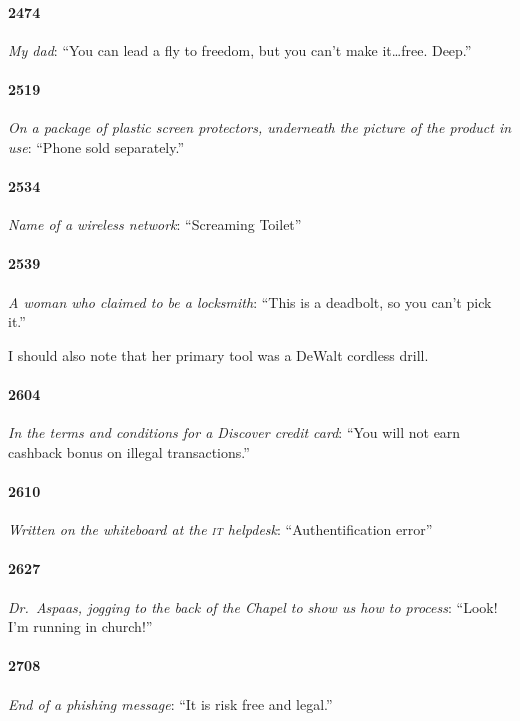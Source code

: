 \documentclass[10pt]{memoir}
\newcommand{\intro}[1]{\emph{#1}}
\begin{document}
\paragraph{2474} \intro{My dad}: ``You can lead a fly to freedom, but you can't make it\ldots free. Deep.''

\paragraph{2519} \intro{On a package of plastic screen protectors, underneath the picture of the product in use}: ``Phone sold separately.''

\paragraph{2534} \intro{Name of a wireless network}: ``Screaming Toilet''

\paragraph{2539} \intro{A woman who claimed to be a locksmith}: ``This is a deadbolt, so you can't pick it.''

I should also note that her primary tool was a DeWalt cordless drill.

\paragraph{2604} \intro{In the terms and conditions for a Discover credit card}: ``You will not earn cashback bonus on illegal transactions.''

\paragraph{2610} \intro{Written on the whiteboard at the \textsc{it} helpdesk}: ``Authentification error''

\paragraph{2627} \intro{Dr.\ Aspaas, jogging to the back of the Chapel to show us how to process}: ``Look! I'm running in church!''

\paragraph{2708} \intro{End of a phishing message}: ``It is risk free and legal.''
\end{document}
